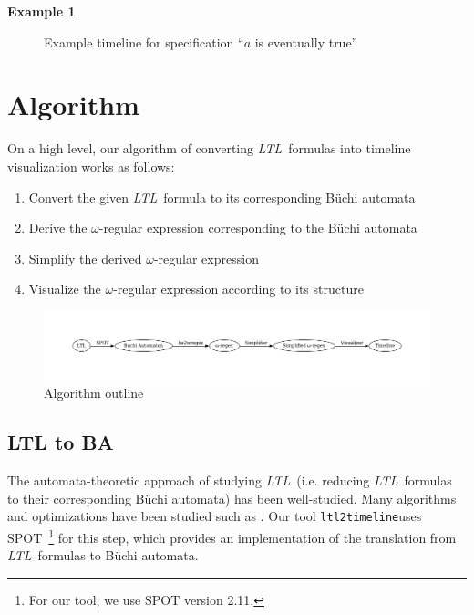 \documentclass[preprint,12pt]{elsarticle}
\theoremstyle{definition}
\newtheorem{example}{Example}[section]
\theoremstyle{remark}
\newcommand{\ltl}{\textit{LTL}}
\newcommand{\Buchi}{B\"{u}chi }
\newcommand{\tool}{\hspace{0.1cm}\texttt{ltl2timeline}\hspace{0.1cm}}
\begin{document}
\begin{example}
\begin{figure}[!h]
        \caption{Example timeline for specification ``$a$ is eventually true''}
        \label{fig:ex15}
    \end{figure}
\end{example}

\section{Algorithm}
On a high level, our algorithm of converting \ltl\ formulas into timeline visualization works as follows:
\begin{enumerate}
    \item Convert the given \ltl\ formula to its corresponding \Buchi automata %
    \item Derive the $\omega$-regular expression corresponding to the \Buchi automata %
    \item Simplify the derived $\omega$-regular expression %
    \item Visualize the $\omega$-regular expression according to its structure %
\end{enumerate}
\begin{figure}[!h]
    \centering
    \includegraphics[width=\textwidth]{img/algorithm_outline.pdf}
    \caption{Algorithm outline}
    \label{fig:algo}
\end{figure}

\subsection{LTL to BA} \label{ltl2aut}
The automata-theoretic approach \cite{ORBi-a8d60ab6-1101-4434-9511-c01ea4e5a15b} of studying \ltl\ (i.e. reducing \ltl\ formulas to their corresponding \Buchi automata) has been well-studied. Many algorithms and optimizations have been studied such as \cite{DGV99, F03}. Our tool \tool uses SPOT~\cite{Dur22}\footnote{For our tool, we use SPOT version 2.11.} for this step, which provides an implementation of the translation from \ltl\ formulas to \Buchi automata.
\end{document}
